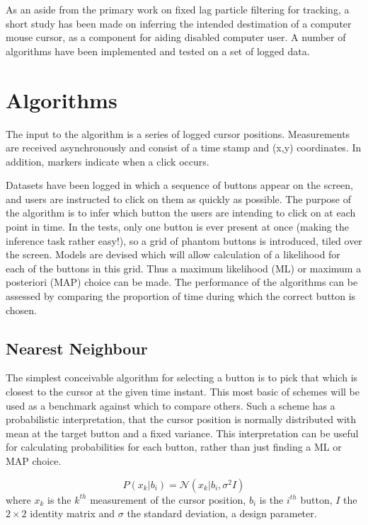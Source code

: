 As an aside from the primary work on fixed lag particle filtering for tracking, a short study has been made on inferring the intended destimation of a computer mouse cursor, as a component for aiding disabled computer user. A number of algorithms have been implemented and tested on a set of logged data.



\section{Algorithms}
The input to the algorithm is a series of logged cursor positions. Measurements are received asynchronously and consist of a time stamp and (x,y) coordinates. In addition, markers indicate when a click occurs.

Datasets have been logged in which a sequence of buttons appear on the screen, and users are instructed to click on them as quickly as possible. The purpose of the algorithm is to infer which button the users are intending to click on at each point in time. In the tests, only one button is ever present at once (making the inference task rather easy!), so a grid of phantom buttons is introduced, tiled over the screen. Models are devised which will allow calculation of a likelihood for each of the buttons in this grid. Thus a maximum likelihood (ML) or maximum a posteriori (MAP) choice can be made. The performance of the algorithms can be assessed by comparing the proportion of time during which the correct button is chosen.



\subsection{Nearest Neighbour}
The simplest conceivable algorithm for selecting a button is to pick that which is closest to the cursor at the given time instant. This most basic of schemes will be used as a benchmark against which to compare others. Such a scheme has a probabilistic interpretation, that the cursor position is normally distributed with mean at the target button and a fixed variance. This interpretation can be useful for calculating probabilities for each button, rather than just finding a ML or MAP choice.

\begin{equation}P(x_k|b_i) = \mathcal{N}(x_k|b_i, \sigma^2 I)\end{equation}
where $x_k$ is the $k^{th}$ measurement of the cursor position, $b_i$ is the $i^{th}$ button, $I$ the $2 \times 2$ identity matrix and $\sigma$ the standard deviation, a design parameter.

